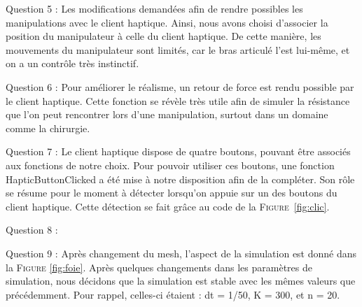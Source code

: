 \documentclass[a4paper,12pt]{article}
\begin{document}
Question 5 : Les modifications demandées afin de rendre possibles les manipulations avec le client haptique. Ainsi, nous avons choisi d'associer la position du manipulateur à celle du client haptique. De cette manière, les mouvements du manipulateur sont limités, car le bras articulé l'est lui-même, et on a un contrôle très instinctif.

Question 6 : Pour améliorer le réalisme, un retour de force est rendu possible par le client haptique. Cette fonction se révèle très utile afin de simuler la résistance que l'on peut rencontrer lors d'une manipulation, surtout dans un domaine comme la chirurgie.

Question 7 : Le client haptique dispose de quatre boutons, pouvant être associés aux fonctions de notre choix. Pour pouvoir utiliser ces boutons, une fonction \og{}HapticButtonClicked\fg{} a été mise à notre disposition afin de la compléter. Son rôle se résume pour le moment à détecter lorsqu'on appuie sur un des boutons du client haptique. Cette détection se fait grâce au code de la \textsc{Figure}~\ref{fig:clic}.

Question 8 :%

Question 9 : Après changement du mesh, l'aspect de la simulation est donné dans la \textsc{Figure} \ref{fig:foie}. Après quelques changements dans les paramètres de simulation, nous décidons que la simulation est stable avec les mêmes valeurs que précédemment. Pour rappel, celles-ci étaient : dt = 1/50, K = 300, et n = 20.
\end{document}
